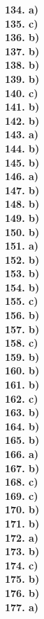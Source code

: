 \documentclass[8pt]{extarticle}
\begin{document}
\begin{multicols}{8}
\textbf{134. a)} \\
\textbf{135. c)} \\
\textbf{136. b)} \\
\textbf{137. b)} \\
\textbf{138. b)} \\
\textbf{139. b)} \\
\textbf{140. c)} \\
\textbf{141. b)} \\
\textbf{142. b)} \\
\textbf{143. a)} \\
\textbf{144. b)} \\
\textbf{145. b)} \\
\textbf{146. a)} \\
\textbf{147. b)} \\
\textbf{148. b)} \\
\textbf{149. b)} \\
\textbf{150. b)} \\
\textbf{151. a)} \\
\textbf{152. b)} \\
\textbf{153. b)} \\
\textbf{154. b)} \\
\textbf{155. c)} \\
\textbf{156. b)} \\
\textbf{157. b)} \\
\textbf{158. c)} \\
\textbf{159. b)} \\
\textbf{160. b)} \\
\textbf{161. b)} \\
\textbf{162. c)} \\
\textbf{163. b)} \\
\textbf{164. b)} \\
\textbf{165. b)} \\
\textbf{166. a)} \\
\textbf{167. b)} \\
\textbf{168. c)} \\
\textbf{169. c)} \\
\textbf{170. b)} \\
\textbf{171. b)} \\
\textbf{172. a)} \\
\textbf{173. b)} \\
\textbf{174. c)} \\
\textbf{175. b)} \\
\textbf{176. b)} \\
\textbf{177. a)} \\

\end{multicols}
\end{document}
